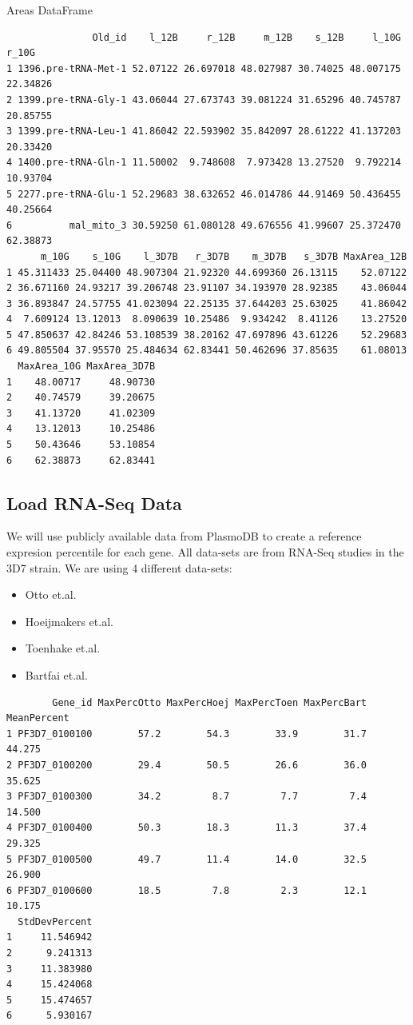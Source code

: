\documentclass[11pt]{article}
\begin{document}
Areas DataFrame
\begin{verbatim}
               Old_id    l_12B     r_12B     m_12B    s_12B     l_10G    r_10G
1 1396.pre-tRNA-Met-1 52.07122 26.697018 48.027987 30.74025 48.007175 22.34826
2 1399.pre-tRNA-Gly-1 43.06044 27.673743 39.081224 31.65296 40.745787 20.85755
3 1399.pre-tRNA-Leu-1 41.86042 22.593902 35.842097 28.61222 41.137203 20.33420
4 1400.pre-tRNA-Gln-1 11.50002  9.748608  7.973428 13.27520  9.792214 10.93704
5 2277.pre-tRNA-Glu-1 52.29683 38.632652 46.014786 44.91469 50.436455 40.25664
6          mal_mito_3 30.59250 61.080128 49.676556 41.99607 25.372470 62.38873
      m_10G    s_10G    l_3D7B   r_3D7B    m_3D7B   s_3D7B MaxArea_12B
1 45.311433 25.04400 48.907304 21.92320 44.699360 26.13115    52.07122
2 36.671160 24.93217 39.206748 23.91107 34.193970 28.92385    43.06044
3 36.893847 24.57755 41.023094 22.25135 37.644203 25.63025    41.86042
4  7.609124 13.12013  8.090639 10.25486  9.934242  8.41126    13.27520
5 47.850637 42.84246 53.108539 38.20162 47.697896 43.61226    52.29683
6 49.805504 37.95570 25.484634 62.83441 50.462696 37.85635    61.08013
  MaxArea_10G MaxArea_3D7B
1    48.00717     48.90730
2    40.74579     39.20675
3    41.13720     41.02309
4    13.12013     10.25486
5    50.43646     53.10854
6    62.38873     62.83441
\end{verbatim}

\subsection{Load RNA-Seq Data}
\label{sec:org2b487f8}
We will use publicly available data from PlasmoDB to create a reference expresion percentile for each gene.
All data-sets are from RNA-Seq studies in the 3D7 strain.
We are using 4 different data-sets:
\begin{itemize}
\item Otto et.al.
\item Hoeijmakers et.al.
\item Toenhake et.al.
\item Bartfai et.al.
\end{itemize}

\begin{verbatim}
        Gene_id MaxPercOtto MaxPercHoej MaxPercToen MaxPercBart MeanPercent
1 PF3D7_0100100        57.2        54.3        33.9        31.7      44.275
2 PF3D7_0100200        29.4        50.5        26.6        36.0      35.625
3 PF3D7_0100300        34.2         8.7         7.7         7.4      14.500
4 PF3D7_0100400        50.3        18.3        11.3        37.4      29.325
5 PF3D7_0100500        49.7        11.4        14.0        32.5      26.900
6 PF3D7_0100600        18.5         7.8         2.3        12.1      10.175
  StdDevPercent
1     11.546942
2      9.241313
3     11.383980
4     15.424068
5     15.474657
6      5.930167
\end{verbatim}
\end{document}
